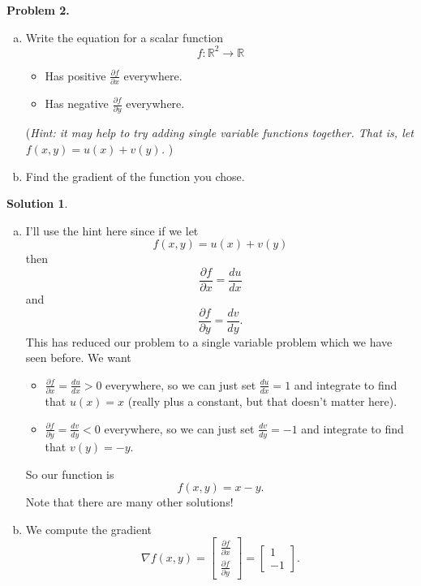 \documentclass[12pt]{report} %
\newcommand{\R}{\mathbb{R}}
\theoremstyle{definition}
\newtheorem{solution}{Solution}
\begin{document}
\noindent\textbf{Problem 2.} 
\begin{enumerate}[(a)]
    \item Write the equation for a scalar function
    \[
    f\colon \R^2 \to \R
    \]
    \begin{itemize}
        \item Has positive $\frac{\partial f}{\partial x}$ everywhere.
        \item Has negative $\frac{\partial f}{\partial y}$ everywhere.
    \end{itemize}
    (\emph{Hint: it may help to try adding single variable functions together. That is, let $f(x,y)=u(x)+v(y)$.}
    )
    \item Find the gradient of the function you chose.
\end{enumerate}
\begin{solution}~
\begin{enumerate}[(a)]
    \item I'll use the hint here since if we let
    \[
    f(x,y) = u(x)+v(y)
    \]
    then
    \[
    \frac{\partial f}{\partial x} = \frac{du}{dx}
    \]
    and
    \[
    \frac{\partial f}{\partial y} = \frac{dv}{dy}.
    \]
    This has reduced our problem to a single variable problem which we have seen before.  We want
    \begin{itemize}
        \item $\frac{\partial f}{\partial x}=\frac{du}{dx}>0$ everywhere, so we can just set $\frac{du}{dx}=1$ and integrate to find that $u(x)=x$ (really plus a constant, but that doesn't matter here).
        \item $\frac{\partial f}{\partial y}=\frac{dv}{dy}<0$ everywhere, so we can just set $\frac{dv}{dy}=-1$ and integrate to find that $v(y)=-y$.
    \end{itemize}
    So our function is
    \[
    f(x,y)=x-y.
    \]
    Note that there are many other solutions!
    
    \item We compute the gradient
    \[
    \nabla f(x,y) = \begin{bmatrix} \frac{\partial f}{\partial x} \\ \frac{\partial f}{\partial y} \end{bmatrix} = \begin{bmatrix} 1 \\ -1 \end{bmatrix}.
    \]
\end{enumerate}
\end{solution}
\end{document}
